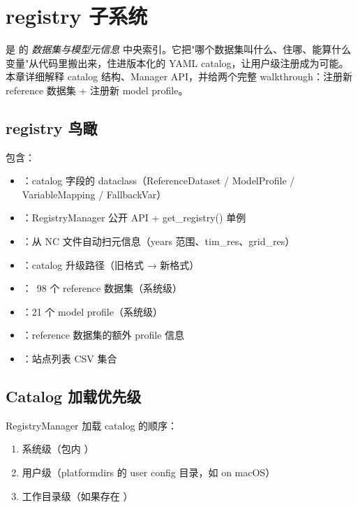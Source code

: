 
\chapter{registry 子系统}

 是 \openbench{} 的 \emph{数据集与模型元信息} 中央索引。它把"哪个数据集叫什么、住哪、能算什么变量"从代码里搬出来，住进版本化的 YAML catalog，让用户级注册成为可能。本章详细解释 catalog 结构、Manager API，并给两个完整 walkthrough：注册新 reference 数据集 + 注册新 model profile。

\section{registry 鸟瞰}

 包含：

\begin{itemize}
  \item {}：catalog 字段的 dataclass（ReferenceDataset / ModelProfile / VariableMapping / FallbackVar）
  \item {}：RegistryManager 公开 API + get\_registry() 单例
  \item {}：从 NC 文件自动扫元信息（years 范围、tim\_res、grid\_res）
  \item {}：catalog 升级路径（旧格式 → 新格式）
  \item {}：~98 个 reference 数据集（系统级）
  \item {}：21 个 model profile（系统级）
  \item {}：reference 数据集的额外 profile 信息
  \item {}：站点列表 CSV 集合
\end{itemize}

\section{Catalog 加载优先级}

RegistryManager 加载 catalog 的顺序：

\begin{enumerate}
  \item 系统级（包内 ）
  \item 用户级（platformdirs 的 user config 目录，如  on macOS）
  \item 工作目录级（如果存在 ）
\end{enumerate}

